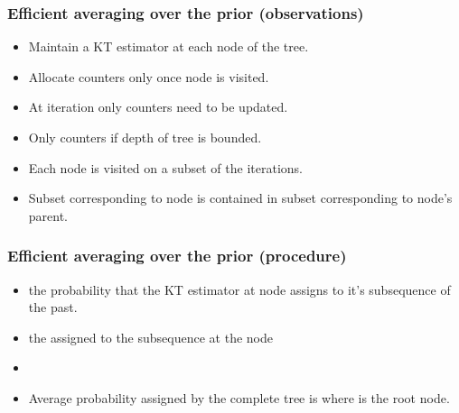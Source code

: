 \documentclass[handout]{beamer}
\begin{document}
\begin{frame}
\frametitle{Efficient averaging over the prior (observations)}
\begin{itemize}
\item Maintain a KT estimator at each node of the tree.
\item Allocate counters only once node is visited.
\item At iteration  only  counters need to be updated.
\item Only  counters if depth of tree is bounded.
\item Each node is visited on a subset of the iterations.
\item Subset corresponding to node is contained in subset corresponding to node's parent.
\end{itemize}
\end{frame}

\begin{frame}
\frametitle{Efficient averaging over the prior (procedure)}
\begin{itemize}
\item {} the probability that the KT estimator at node 
 assigns to it's subsequence of the past.
\item {} the  assigned to the subsequence  at the node 
\item
{}
\item Average probability assigned by the complete tree is  where \R{$\lambda$} is the root node.
\end{itemize}
\end{frame}




%
\end{document}
